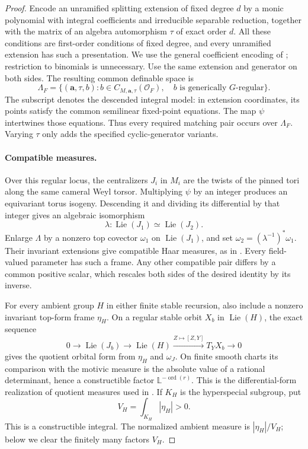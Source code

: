 \begin{proof}
Encode an unramified splitting extension of fixed degree $d$ by a
monic polynomial with integral coefficients and irreducible separable
reduction, together with the matrix of an algebra automorphism $\tau$
of exact order $d$.  All these conditions are first-order conditions
of fixed degree, and every unramified extension has such a
presentation.  We use the general coefficient encoding of
\citet[Section~3.2]{CluckersHalesLoeser2011}; restriction to binomials
is unnecessary.  Use the same extension and generator on both sides.
The resulting common definable space is
\[
 \Lambda_F=
 \{(\mathbf a,\tau,b):
 b\in C_{M,\mathbf a,\tau}(\mathcal O_F),\quad
 b\text{ is generically }G\text{-regular}\}.
\]
The subscript denotes the descended integral model: in extension
coordinates, its points satisfy the common semilinear fixed-point
equations.  The map $\psi$ intertwines those equations.  Thus every
required matching pair occurs over $\Lambda_F$.  Varying $\tau$ only
adds the specified cyclic-generator variants.

\paragraph{Compatible measures.}
Over this regular locus, the centralizers $J_i$ in $M_i$ are the
twists of the pinned tori along the same cameral Weyl torsor.
Multiplying $\psi$ by an integer produces an equivariant torus
isogeny.  Descending it and dividing its differential by that
integer gives an algebraic isomorphism
\[
 \lambda:\operatorname{Lie}(J_1)\simeq
                 \operatorname{Lie}(J_2).
\]
Enlarge $\Lambda$ by a nonzero top covector $\omega_1$ on
$\operatorname{Lie}(J_1)$, and set
$\omega_2=(\lambda^{-1})^*\omega_1$.
Their invariant extensions give compatible Haar measures, as in
\citet[Section~1.12, before Theorem~1.12.7]{Ngo2010FundamentalLemma}.
Every field-valued parameter has such a frame.  Any other compatible
pair differs by a common positive scalar, which rescales both sides
of the desired identity by its inverse.

For every ambient group $H$ in either finite stable recursion,
also include a nonzero invariant top-form frame $\eta_H$.
On a regular stable orbit $X_b$ in $\operatorname{Lie}(H)$, the
exact sequence
\[
 0\longrightarrow\operatorname{Lie}(J_b)
 \longrightarrow\operatorname{Lie}(H)
 \xrightarrow{Z\mapsto[Z,Y]}T_YX_b\longrightarrow0
\]
gives the quotient orbital form from $\eta_H$ and $\omega_J$.
On finite smooth charts its comparison with the motivic measure
is the absolute value of a rational determinant, hence a
constructible factor $\mathbb L^{-\operatorname{ord}(r)}$.
This is the differential-form realization of quotient measures
used in \citet[Sections~7 and~8.6]{CluckersHalesLoeser2011}.
If $K_H$ is the hyperspecial subgroup, put
\[
 V_H=\int_{K_H}|\eta_H|>0.
\]
This is a constructible integral.  The normalized ambient measure is
$|\eta_H|/V_H$; below we clear the finitely many factors $V_H$.


\end{proof}
